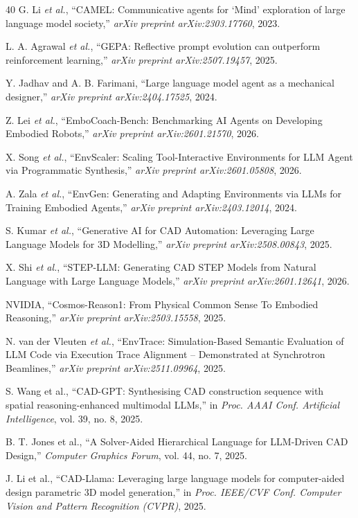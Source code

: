 \documentclass[conference]{IEEEtran}
\begin{document}
\begin{thebibliography}{40}
G. Li \emph{et al.}, ``CAMEL: Communicative agents for `Mind' exploration of large language model society,'' \emph{arXiv preprint arXiv:2303.17760}, 2023.

L. A. Agrawal \emph{et al.}, ``GEPA: Reflective prompt evolution can outperform reinforcement learning,'' \emph{arXiv preprint arXiv:2507.19457}, 2025.

Y. Jadhav and A. B. Farimani, ``Large language model agent as a mechanical designer,'' \emph{arXiv preprint arXiv:2404.17525}, 2024.

Z. Lei \emph{et al.}, ``EmboCoach-Bench: Benchmarking AI Agents on Developing Embodied Robots,'' \emph{arXiv preprint arXiv:2601.21570}, 2026.

X. Song \emph{et al.}, ``EnvScaler: Scaling Tool-Interactive Environments for LLM Agent via Programmatic Synthesis,'' \emph{arXiv preprint arXiv:2601.05808}, 2026.

A. Zala \emph{et al.}, ``EnvGen: Generating and Adapting Environments via LLMs for Training Embodied Agents,'' \emph{arXiv preprint arXiv:2403.12014}, 2024.

S. Kumar \emph{et al.}, ``Generative AI for CAD Automation: Leveraging Large Language Models for 3D Modelling,'' \emph{arXiv preprint arXiv:2508.00843}, 2025.

X. Shi \emph{et al.}, ``STEP-LLM: Generating CAD STEP Models from Natural Language with Large Language Models,'' \emph{arXiv preprint arXiv:2601.12641}, 2026.

NVIDIA, ``Cosmos-Reason1: From Physical Common Sense To Embodied Reasoning,'' \emph{arXiv preprint arXiv:2503.15558}, 2025.

N. van der Vleuten \emph{et al.}, ``EnvTrace: Simulation-Based Semantic Evaluation of LLM Code via Execution Trace Alignment -- Demonstrated at Synchrotron Beamlines,'' \emph{arXiv preprint arXiv:2511.09964}, 2025.

S. Wang et al., ``CAD-GPT: Synthesising CAD construction sequence with spatial reasoning-enhanced multimodal LLMs,'' in \emph{Proc. AAAI Conf. Artificial Intelligence}, vol. 39, no. 8, 2025.

B. T. Jones et al., ``A Solver-Aided Hierarchical Language for LLM-Driven CAD Design,'' \emph{Computer Graphics Forum}, vol. 44, no. 7, 2025.

J. Li et al., ``CAD-Llama: Leveraging large language models for computer-aided design parametric 3D model generation,'' in \emph{Proc. IEEE/CVF Conf. Computer Vision and Pattern Recognition (CVPR)}, 2025.


\end{thebibliography}
\end{document}
